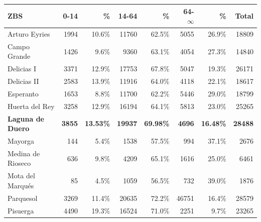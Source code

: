 \begin{table}[H]
    \centering
    \begin{tabular}{lrrrrrrr}
        \toprule
        ZBS                      & 0-14          & \%               & 14-64          & \%               & 64-$\infty$   & \%               & Total          \\
        \midrule
        Arturo Eyries            & 1994          & 10.6\%           & 11760          & 62.5\%           & 5055          & 26.9\%           & 18809          \\
        Campo Grande             & 1426          & 9.6\%            & 9360           & 63.1\%           & 4054          & 27.3\%           & 14840          \\
        Delicias I               & 3371          & 12.9\%           & 17753          & 67.8\%           & 5047          & 19.3\%           & 26171          \\
        Delicias II              & 2583          & 13.9\%           & 11916          & 64.0\%           & 4118          & 22.1\%           & 18617          \\
        Esperanto                & 1653          & 8.8\%            & 11700          & 62.2\%           & 5446          & 29.0\%           & 18799          \\
        Huerta del Rey           & 3258          & 12.9\%           & 16194          & 64.1\%           & 5813          & 23.0\%           & 25265          \\
        \textbf{Laguna de Duero} & \textbf{3855} & \textbf{13.53\%} & \textbf{19937} & \textbf{69.98\%} & \textbf{4696} & \textbf{16.48\%} & \textbf{28488} \\
        Mayorga                  & 144           & 5.4\%            & 1538           & 57.5\%           & 994           & 37.1\%           & 2676           \\
        Medina de Rioseco        & 636           & 9.8\%            & 4209           & 65.1\%           & 1616          & 25.0\%           & 6461           \\
        Mota del Marqués         & 85            & 4.5\%            & 1059           & 56.5\%           & 732           & 39.0\%           & 1876           \\
        Parquesol                & 3269          & 11.4\%           & 20635          & 72.2\%           & 46751         & 16.4\%           & 28579          \\
        Pisuerga                 & 4490          & 19.3\%           & 16524          & 71.0\%           & 2251          & 9.7\%            & 23265          \\

\end{tabular}
\end{table}

